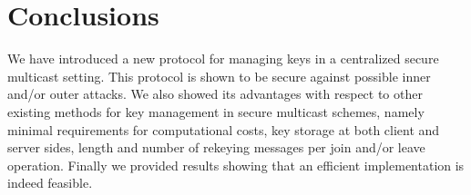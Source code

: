 \documentclass[a4paper,11pt]{amsart}
\theoremstyle{definition}
\begin{document}
\section{Conclusions}

We have introduced a new protocol for managing keys in a centralized
secure multicast setting. This protocol is shown to be secure against
possible inner and/or outer attacks.  We also showed its advantages
with respect to other existing methods for key management in secure
multicast schemes, namely minimal requirements for computational
costs, key storage at both client and server sides, length and number
of rekeying messages per join and/or leave operation. Finally we
provided results showing that an efficient implementation is indeed
feasible.
\end{document}
